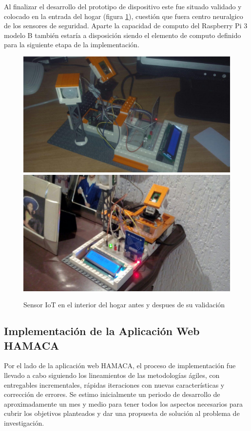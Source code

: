 Al finalizar el desarrollo del prototipo de dispositivo este fue situado validado y colocado en la entrada del hogar (figura \ref{fig:rpi3peter_zero}), cuestión que fuera centro neuralgico de los sensores de seguridad. Aparte la capacidad de computo del Raspberry Pi 3 modelo B también estaría a disposición siendo el elemento de computo definido para la siguiente etapa de la implementación.
\begin{figure}[!htb]
\centering
\includegraphics[scale=0.2]{./Figuras/rpi3peter_zero_proto.jpg}
\includegraphics[scale=0.15]{./Figuras/rpi3peter_zero.jpg}
\caption{Sensor IoT en el interior del hogar antes y despues de su validación}
\label{fig:rpi3peter_zero}
\vspace*{-10pt}
\end{figure}


\subsection{Implementación de la Aplicación Web HAMACA}
Por el lado de la aplicación web HAMACA, el proceso de implementación fue llevado a cabo siguiendo los lineamientos de las metodologías ágiles, con entregables incrementales, rápidas iteraciones con nuevas características y corrección de errores. Se estimo inicialmente un periodo de desarrollo de aproximadamente un mes y medio para tener todos los aspectos necesarios para cubrir los objetivos planteados y dar una propuesta de solución al problema de investigación.


